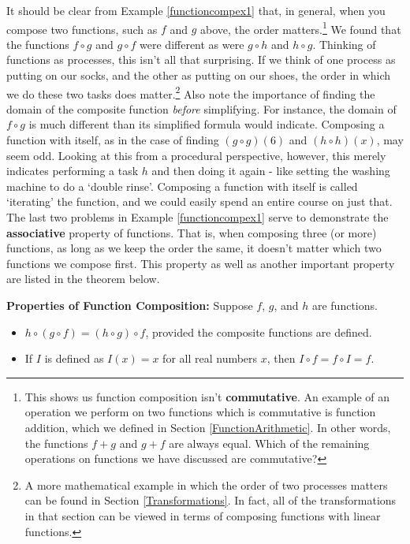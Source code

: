 It should be clear from Example \ref{functioncompex1} that, in general, when you compose two functions, such as $f$ and $g$ above, the order matters.\footnote{This shows us function composition isn't \textbf{commutative}.  An example of an operation we perform on two functions which is commutative is function addition, which we defined in Section \ref{FunctionArithmetic}.  In other words, the functions $f+g$ and $g+f$ are always equal.  Which of the remaining operations on functions we have discussed are commutative?}   We found that the functions $f \circ g$ and $g \circ f$ were different as were $g \circ h$ and $h \circ g$.  Thinking of functions as processes, this isn't all that surprising.  If we think of one process as putting on our socks, and the other as putting on our shoes, the order in which we do these two tasks does matter.\footnote{A more mathematical example in which the order of two processes matters can be found in Section \ref{Transformations}.  In fact, all of the transformations in that section can be viewed in terms of composing functions with linear functions.}  Also note the importance of finding the domain of the composite function \textit{before} simplifying.  For instance, the domain  of $f \circ g$ is much different than its simplified formula would indicate.  Composing a function with itself, as in the case of finding $(g\circ g)(6)$ and $(h \circ h)(x)$, may seem odd.  Looking at this from a procedural perspective, however, this merely indicates performing a task $h$ and then doing it again - like setting the washing machine to do a `double rinse'. Composing a function with itself is called `iterating' the function, and we could easily spend an entire course on just that. The last two problems in Example \ref{functioncompex1} serve to demonstrate the  \textbf{associative} property of functions.  That is, when composing three (or more) functions, as long as we keep the order the same, it doesn't matter which two functions we compose first. This property as well as another important property are listed in the theorem below.

\medskip

\colorbox{ResultColor}{\bbm
\begin{thm}\label{functioncompprops}  \textbf{Properties of Function Composition:} Suppose $f$, $g$, and $h$ are functions.  

\begin{itemize}

\item  $h \circ (g \circ f) = (h \circ g) \circ f$, provided the composite functions are defined.

\item  If $I$ is defined as $I(x) = x$ for all real numbers $x$, then $ I \circ f = f \circ I =f$.

\end{itemize}

\end{thm}
\ebm}

